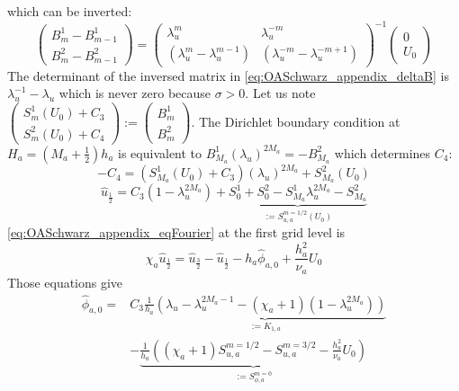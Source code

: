 which can be inverted:
\begin{equation}
	\label{eq:OASchwarz_appendix_deltaB}
	\begin{pmatrix}
B_m^1 - B_{m-1}^1\\
B_m^2 - B_{m-1}^2
	\end{pmatrix}
	=
	\begin{pmatrix}
		\lambda_u^m & \lambda_u^{-m} \\
		(\lambda_u^m - \lambda_u^{m-1})  & 
		(\lambda_u^{-m} - \lambda_u^{-m+1})
	\end{pmatrix}^{-1}
	\begin{pmatrix}
		0 \\ U_0
	\end{pmatrix}
\end{equation}
The determinant of the inversed matrix in
\eqref{eq:OASchwarz_appendix_deltaB} is
$\lambda_u^{-1} - \lambda_u$ which is never zero because
$\sigma > 0$.
Let us note 
$\begin{pmatrix}
	S_m^1(U_0) + {C}_3\\
	S_m^2(U_0) + {C}_4
\end{pmatrix}:=\begin{pmatrix}
B_m^1\\
B_m^2
\end{pmatrix}$.
The Dirichlet boundary condition at $H_a = (M_a + \frac{1}{2})h_a$
is equivalent to
$B_{M_a}^1 (\lambda_u)^{2M_a} = - B_{M_a}^2$ which determines
${C}_4$:
\begin{equation}
- {C}_4 = \left(S_{M_a}^1(U_0) + {C}_3\right)
	(\lambda_u)^{2M_a} + S_{M_a}^2(U_0)
\end{equation}
\begin{equation}
		\widehat{u}_{\frac{1}{2}} = {C}_3 (1 - \lambda_u^{2M_a})
	+ \underbrace{S_0^1+S_0^2 - S_{M_a}^1 \lambda_u^{2M_a}
		-S_{M_a}^2}_{:=S_{u, a}^{m=1/2}(U_0)}
\end{equation}
\eqref{eq:OASchwarz_appendix_eqFourier} at the first grid level is
\begin{equation}
	\chi_a \widehat{u}_{\frac{1}{2}} =
	\widehat{u}_{\frac{3}{2}} - \widehat{u}_{\frac{1}{2}}
	- h_a \widehat{\phi}_{a,0} + \frac{h^2_a}{\nu_a} U_0
\end{equation}
Those equations give
\begin{equation}
	\begin{aligned}
		\widehat{\phi}_{a,0} =&{C}_3 \underbrace{\frac{1}{h_a}
		\left(
			\lambda_u-\lambda_u^{2M_a-1}
			- (\chi_a+1)(1-\lambda_u^{2M_a})
			\right)}_{:=K_{1,a}}\\
		&-\underbrace{\frac{1}{h_a}\left((\chi_a + 1) S_{u,a}^{m=1/2}
		- S_{u,a}^{m=3/2}
		- \frac{h_a^2}{\nu_a} U_0\right)}_{:=S_{\phi,a}^{m=0}}
	\end{aligned}
\end{equation}
